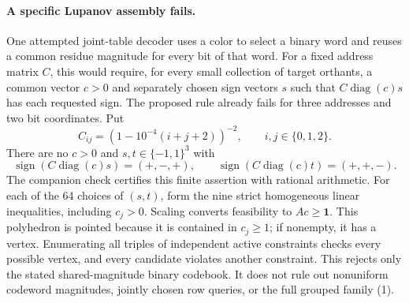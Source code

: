 \documentclass[11pt]{article}
\begin{document}
\paragraph{A specific Lupanov assembly fails.}
One attempted joint-table decoder uses a color to select a binary word
and reuses a common residue magnitude for every bit of that word.
For a fixed address matrix $C$, this would require, for every small
collection of target orthants, a common vector $c>0$ and separately
chosen sign vectors $s$ such that $C\operatorname{diag}(c)s$ has each
requested sign. The proposed rule already fails for three addresses
and two bit coordinates. Put
\[
 C_{ij}=\left(1-10^{-4}(i+j+2)\right)^{-2},
 \qquad i,j\in\{0,1,2\}.
\]
There are no $c>0$ and $s,t\in\{-1,1\}^3$ with
\[
 \operatorname{sign}(C\operatorname{diag}(c)s)=(+,-,+),
 \qquad
 \operatorname{sign}(C\operatorname{diag}(c)t)=(+,+,-).
\]
The companion check certifies this finite assertion with rational
arithmetic. For each of the 64 choices of $(s,t)$, form the nine strict
homogeneous linear inequalities, including $c_j>0$. Scaling converts
feasibility to $Ac\geq\mathbf1$. This polyhedron is pointed because it
is contained in $c_j\geq1$; if nonempty, it has a vertex. Enumerating
all triples of independent active constraints checks every possible
vertex, and every candidate violates another constraint. This rejects
only the stated shared-magnitude binary codebook. It does not rule out
nonuniform codeword magnitudes, jointly chosen row queries, or the full
grouped family (1).
\end{document}
